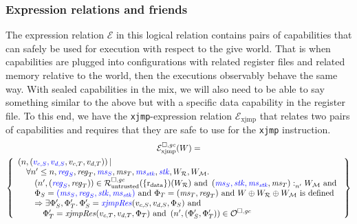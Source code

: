 \documentclass[acmsmall,review,anonymous]{acmart}\settopmatter{printfolios=true,printccs=false,printacmref=false}
\newcommand{\xjmpres}[1]{\plainfun{xjmpRes}{#1}}
\begin{document}
\subsubsection{Expression relations and friends}
The expression relation $\mathcal{E}$ in this logical relation contains pairs of capabilities that can safely be used for execution with respect to the give world.
That is when capabilities are plugged into configurations with related register files  and related memory relative to the world, then the executions observably behave the same way.
With sealed capabilities in the mix, we will also need to be able to say something similar to the above but with a specific data capability in the register file.
To this end, we have the \texttt{xjmp}-expression relation $\mathcal{E}_{\mathrm{xjmp}}$ that relates two pairs of capabilities and requires that they are safe to use for the \texttt{xjmp} instruction.
\begin{multline*}
  \lrexj(W) =
  \\\left\{\begin{array}{l}
      \npair{\stpair[.]{v_{c,S},v_{d,S}}{v_{c,T},v_{d,T}}} | \\
      \quad \forall n' \leq n, \src{\reg_S}, \reg_T, \src{\ms_S}, \ms_T, \src{\ms_\stk}, \src{\stk}, W_\lrrs , W_\lrm \ldotp \\
      \qquad\npair[n']{\stpair{\reg}{\reg}} \in \lrr(\{\rdata\}) (W_\lrrs ) \tand \memSat[n']{\stpair[.]{\ms_S,\stk,\ms_\stk}{\ms_T}}{W_\lrm} \tand \\
      \qquad\Phi_S = \src{(\ms_S,\reg_S,\stk, \ms_\stk)} \tand \Phi_T = (\ms_T,\reg_T) \tand W \oplus W_\lrrs \oplus W_\lrm \text{ is defined }\\
      \qquad\Rightarrow \exists \Phi_S',\Phi_T'\ldotp \Phi_S' = \src{\var{xjmpRes}}(v_{c,S},v_{d,S},\Phi_S) \tand\\
      \quad\qquad\Phi_T' = \xjmpres{v_{c,T},v_{d,T},\Phi_T}\tand\npair[n']{\left(\Phi_S', \Phi_T' \right)}\in \lro
    \end{array}
    \right\}
\end{multline*}
\end{document}
